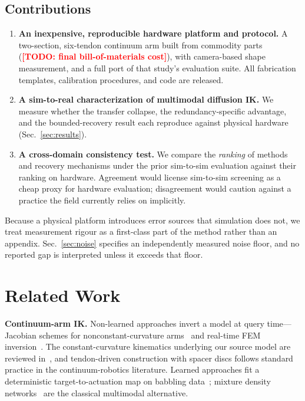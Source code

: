\documentclass[letterpaper, 10pt, conference]{ieeeconf}
\newcommand{\todo}[1]{\textcolor{red}{\textbf{[TODO: #1]}}}
\begin{document}
\subsection*{Contributions}

\begin{enumerate}
  \item \textbf{An inexpensive, reproducible hardware platform and protocol.}
  A two-section, six-tendon continuum arm built from commodity parts
  (\todo{final bill-of-materials cost}), with camera-based shape measurement,
  and a full port of that study's evaluation suite. All fabrication
  templates, calibration procedures, and code are released.

  \item \textbf{A sim-to-real characterization of multimodal diffusion IK.}
  We measure whether the transfer collapse, the redundancy-specific
  advantage, and the bounded-recovery result each reproduce against physical
  hardware (Sec.~\ref{sec:results}).

  \item \textbf{A cross-domain consistency test.} We compare the
  \emph{ranking} of methods and recovery mechanisms under the prior
  sim-to-sim evaluation against their ranking on hardware. Agreement would
  license sim-to-sim screening as a cheap proxy for hardware evaluation;
  disagreement would caution against a practice the field currently relies on
  implicitly.
\end{enumerate}

Because a physical platform introduces error sources that simulation does
not, we treat measurement rigour as a first-class part of the method rather
than an appendix. Sec.~\ref{sec:noise} specifies an independently measured
noise floor, and no reported gap is interpreted unless it exceeds that floor.

\section{Related Work}

\textbf{Continuum-arm IK.} Non-learned approaches invert a model at query
time---Jacobian schemes for nonconstant-curvature
arms~\cite{giorelli2015neural} and real-time FEM
inversion~\cite{duriez2013control}. The constant-curvature kinematics
underlying our source model are reviewed in~\cite{webster2010design}, and
tendon-driven construction with spacer discs follows standard practice in the
continuum-robotics literature. Learned approaches fit a deterministic
target-to-actuation map on babbling data~\cite{giorelli2015neural}; mixture
density networks~\cite{bishop1994mixture} are the classical multimodal
alternative.
\end{document}
